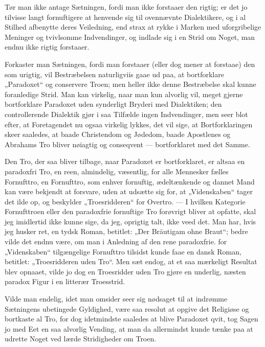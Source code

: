 \documentclass[12pt,a4paper]{book}
\newcommand{\opage}[1]{\marginnote{\footnotesize\textit{[#1]}}}
\begin{document}
Tør man ikke antage Sætningen, fordi man ikke forstaaer den rigtig; er det jo
tilvisse langt fornuftigere at henvende sig til ovennævnte Dialektikere, og i
al Stilhed afbenytte deres Veiledning, end strax at rykke i Marken med
uforgribelige Meninger og tvivlsomme Indvendinger, og indlade sig i en Strid
om Noget, man endnu ikke rigtig forstaaer.

Forkaster man Sætningen, fordi man forstaaer (eller dog mener at forstaae)
den som urigtig, vil Bestræbelsen naturligviis gaae ud paa, at
\opage{174} bortforklare „Paradoxet“ og conservere Troen; men heller ikke denne
Bestræbelse skal kunne foranledige Strid. Man kan virkelig, naar man kun
alvorlig vil, meget gjerne bortforklare Paradoxet uden synderligt Bryderi med
Dialektiken; den controllerende Dialektik gjør i saa Tilfælde ingen
Indvendinger, men seer blot efter, at Foretagendet nu ogsaa virkelig lykkes,
det vil sige, at Bortforklaringen skeer saaledes, at baade Christendom og
Jødedom, baade Apostlenes og Abrahams Tro bliver nøiagtig og conseqvent ---
bortforklaret med det Samme.

Den Tro, der saa bliver tilbage, naar Paradoxet er bortforklaret, er altsaa
en paradoxfri Tro, en reen, almindelig, væsentlig, for alle Mennesker fælles
Fornufttro, en Fornufttro, som enhver fornuftig, ædeltænkende og dannet Mand
kan være bekjendt at forsvare, uden at udsætte sig for, at „Videnskaben“
tager det ilde op, og beskylder „Troesridderen“ for Overtro. --- I hvilken
Kategorie Fornufttroen eller den paradoxfrie fornuftige Tro forøvrigt bliver
at opfatte, skal jeg imidlertid ikke kunne sige, da jeg, oprigtig talt, ikke
veed det. Man har, hvis jeg husker ret, en tydsk Roman, betitlet: „Der
Bräutigam ohne Braut“; bedre vilde det endnu være, om man i Anledning af den
rene paradoxfrie. for „Videnskaben“ tilgængelige Fornufttro tilsidst kunde
faae en dansk Roman, betitlet: „Troesridderen uden Tro“. Men sæt endog, at et
saa mærkeligt Resultat blev opnaaet, vilde jo dog en Troesridder uden Tro
gjøre en underlig, næsten paradox Figur i en litterær Troesstrid.

Vilde man endelig, idet man omsider seer sig nødsaget til at indrømme
Sætningens ubetingede Gyldighed, være saa resolut at opgive det Religiøse og
bortkaste al Tro, for dog idetmindste saaledes at blive Paradoxet qvit, tog
Sagen jo med Eet en saa alvorlig Vending, at man da allermindst kunde tænke
paa at udrette Noget ved lærde Stridigheder om Troen.
\end{document}
